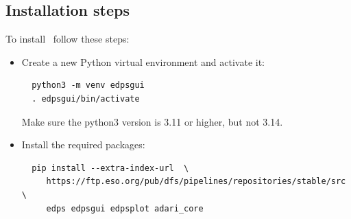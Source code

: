 \subsection{Installation steps}

To install \edps\ follow these steps:

\begin{itemize}

\item Create a new Python virtual environment and activate it:

\begin{verbatim}
  python3 -m venv edpsgui
  . edpsgui/bin/activate
\end{verbatim}

   Make sure the python3 version is 3.11 or higher, but not 3.14. 

\item Install the required packages:

\begin{verbatim}
  pip install --extra-index-url  \
     https://ftp.eso.org/pub/dfs/pipelines/repositories/stable/src \
     edps edpsgui edpsplot adari_core 
\end{verbatim}

\end{itemize}


